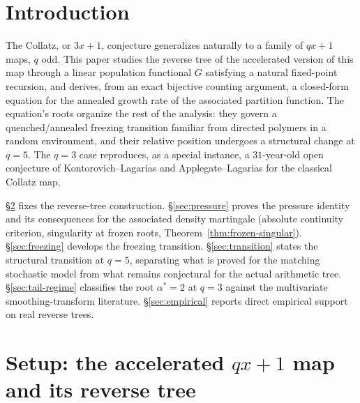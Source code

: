 \documentclass[11pt]{article}
\theoremstyle{remark}
\begin{document}
\section{Introduction}
\label{sec:intro}

The Collatz, or $3x+1$, conjecture generalizes naturally to a family of
$qx+1$ maps, $q$ odd. This paper studies the reverse tree of the
accelerated version of this map through a linear population functional
$G$ satisfying a natural fixed-point recursion, and derives, from an
exact bijective counting argument, a closed-form equation for the annealed growth rate of the
associated partition function. The equation's roots organize the rest
of the analysis: they govern a quenched/annealed freezing transition
familiar from directed polymers in a random environment, and their
relative position undergoes a structural change at $q=5$. The $q=3$
case reproduces, as a special instance, a $31$-year-old open conjecture
of Kontorovich--Lagarias and Applegate--Lagarias for the classical
Collatz map.

\S\ref{sec:setup} fixes the reverse-tree construction.
\S\ref{sec:pressure} proves the pressure identity and its consequences
for the associated density martingale (absolute continuity criterion,
singularity at frozen roots, Theorem~\ref{thm:frozen-singular}).
\S\ref{sec:freezing} develops the
freezing transition. \S\ref{sec:transition} states the structural
transition at $q=5$, separating what is proved for the
matching stochastic model from what remains conjectural for the
actual arithmetic tree. \S\ref{sec:tail-regime} classifies the root
$\alpha^\ast=2$ at $q=3$ against the multivariate smoothing-transform
literature. \S\ref{sec:empirical} reports direct empirical support on
real reverse trees.

\section{Setup: the accelerated $qx+1$ map and its reverse tree}
\label{sec:setup}
\end{document}
